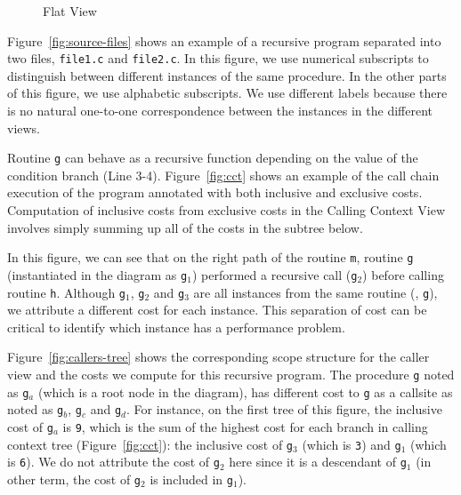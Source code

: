\begin{figure}
\caption{Flat View}
\label{fig:flat-tree}
\end{figure}


Figure~\ref{fig:source-files} shows an example of a recursive program separated into two files, \texttt{file1.c} and \texttt{file2.c}.
In this figure, we use numerical subscripts to distinguish between different instances of the same procedure.
In the other parts of this figure, we use alphabetic subscripts.
We use different labels because there is no natural one-to-one correspondence between the instances in the different views.

Routine \texttt{g} can behave as a recursive function depending on the value of the condition branch (Line 3-4).
Figure~\ref{fig:cct} shows an example of the call chain execution of the program annotated with both inclusive and exclusive costs.
Computation of inclusive costs from exclusive costs in the Calling Context View involves simply summing up all of the costs in the subtree below.

In this figure, we can see that on the right path of the routine \texttt{m}, routine \texttt{g} (instantiated in the diagram as \texttt{g$_1$}) performed a recursive call (\texttt{g$_2$}) before calling routine \texttt{h}.
Although \texttt{g$_1$}, \texttt{g$_2$} and \texttt{g$_3$} are all instances from the same routine (\ie{}, \texttt{g}), we attribute a different cost for each instance.
This separation of cost can be critical to identify which instance has a performance problem.

 Figure~\ref{fig:callers-tree} shows the corresponding scope structure for the caller view and the costs we compute for this recursive program. The procedure
\texttt{g} noted as \texttt{g$_a$} (which is a root node in the diagram), has different cost to \texttt{g} as a callsite as noted as \texttt{g$_b$}, \texttt{g$_c$} and \texttt{g$_d$}.
For instance, on the first tree of this figure, the inclusive cost of \texttt{g$_a$} is \texttt{9}, which is the sum of the highest cost for each branch in calling context tree (Figure~\ref{fig:cct}): the inclusive cost of \texttt{g$_3$} (which is \texttt{3}) and \texttt{g$_1$} (which is \texttt{6}).
We do not attribute the cost of \texttt{g$_2$} here since it is a descendant of \texttt{g$_1$} (in other term, the cost of \texttt{g$_2$} is included in \texttt{g$_1$}).

